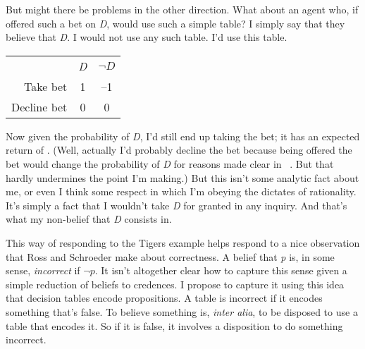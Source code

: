 But might there be problems in the other direction. What about an agent who, if offered such a bet on \emph{D}, would use such a simple table? I simply say that they believe that \emph{D}. I would not use any such table. I'd use this table.

\begin{center}
\begin{tabular}{rcc}
&\emph{D}&$\neg D$\\
Take bet&1&--1\\
Decline bet&0&0\\
\end{tabular}
\end{center}
%
%
%
Now given the probability of \emph{D}, I'd still end up taking the bet; it has an expected return of . (Well, actually I'd probably decline the bet because being offered the bet would change the probability of \emph{D} for reasons made clear in ~\citet[14--15]{RunyonGuysDolls}. But that hardly undermines the point I'm making.) But this isn't some analytic fact about me, or even I think some respect in which I'm obeying the dictates of rationality. It's simply a fact that I wouldn't take \emph{D} for granted in any inquiry. And that's what my non-belief that \emph{D} consists in.

This way of responding to the Tigers example helps respond to a nice observation that Ross and Schroeder make about correctness. A belief that \emph{p} is, in some sense, \emph{incorrect} if $\neg p$. It isn't altogether clear how to capture this sense given a simple reduction of beliefs to credences. I propose to capture it using this idea that decision tables encode propositions. A table is incorrect if it encodes something that's false. To believe something is, \emph{inter alia}, to be disposed to use a table that encodes it. So if it is false, it involves a disposition to do something incorrect.

